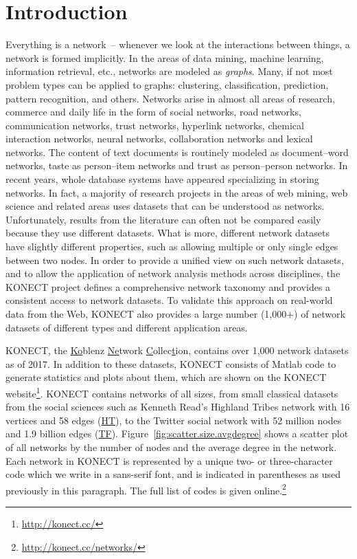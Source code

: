 \documentclass{article}
\begin{document}
\thispagestyle{empty}
\newpage

\section{Introduction}
Everything is a network~-- whenever we look at the interactions between
things, a network is formed implicitly.  In the areas of data mining,
machine learning, information retrieval, etc., networks are modeled
as \emph{graphs}.  Many, if not most problem types can be applied to
graphs: clustering, classification, prediction, pattern recognition, and
others.  Networks arise in almost all areas of research, commerce and
daily life in the form of social networks, road networks, communication
networks, trust networks, hyperlink networks, chemical interaction
networks, neural networks, collaboration networks and lexical networks.
The content of text documents is routinely modeled as document--word
networks, taste as person--item networks and trust as person--person
networks.  In recent years, whole database systems have appeared
specializing in storing networks.  In fact, a majority of research
projects in the areas of web mining, web science and related areas uses
datasets that can be understood as networks.  Unfortunately, results
from the literature can often not be compared easily because
they use different datasets. What is more, different network datasets
have slightly different properties, such as allowing multiple or only
single edges between two nodes.  In order to provide a unified view on
such network datasets, and to allow the application of network analysis
methods across disciplines, the KONECT project defines a comprehensive
network taxonomy and provides a consistent access to network datasets.
To validate this approach on real-world data from the Web, KONECT
also provides a large number (1,000+) of network datasets of different
types and different application areas. 

KONECT, the \underline{Ko}blenz \underline{Ne}twork \underline
Collec\underline tion, contains over 1,000 network datasets as of 2017.
In addition to these datasets, KONECT consists of Matlab code to
generate statistics and plots about them, which are shown on the
KONECT
website\footnote{\href{http://konect.cc/}{http://konect.cc/}}.
KONECT contains networks of all sizes, from small classical datasets
from the social sciences such as Kenneth Read's Highland Tribes network
with 16 vertices and 58 edges
(\href{http://konect.cc/networks/ucidata-gama/}{\textsf{HT}}),
to the Twitter social network with 52 million nodes and 1.9 billion
edges
(\href{http://konect.cc/networks/twitter_mpi/}{\textsf{TF}}).
Figure~\ref{fig:scatter.size.avgdegree} shows a scatter plot of all
networks by the number of nodes and the average degree in the network.
Each network in KONECT is represented by a unique two- or
three-character code which we write in a \textsf{sans-serif font}, and
is indicated in parentheses as used previously in this paragraph. The
full list of codes is given
online.\footnote{\href{http://konect.cc/networks/}{http://konect.cc/networks/}}
\end{document}
